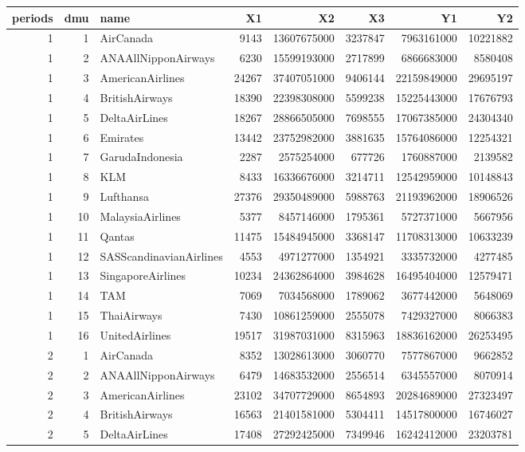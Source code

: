 \begin{tabular}{rrlrrrrr}
\toprule
periods & dmu & name & X1 & X2 & X3 & Y1 & Y2 \\
\midrule
1 & 1 & AirCanada & 9143 & 13607675000 & 3237847 & 7963161000 & 10221882 \\
1 & 2 & ANAAllNipponAirways & 6230 & 15599193000 & 2717899 & 6866683000 & 8580408 \\
1 & 3 & AmericanAirlines & 24267 & 37407051000 & 9406144 & 22159849000 & 29695197 \\
1 & 4 & BritishAirways & 18390 & 22398308000 & 5599238 & 15225443000 & 17676793 \\
1 & 5 & DeltaAirLines & 18267 & 28866505000 & 7698555 & 17067385000 & 24304340 \\
1 & 6 & Emirates & 13442 & 23752982000 & 3881635 & 15764086000 & 12254321 \\
1 & 7 & GarudaIndonesia & 2287 & 2575254000 & 677726 & 1760887000 & 2139582 \\
1 & 8 & KLM & 8433 & 16336676000 & 3214711 & 12542959000 & 10148843 \\
1 & 9 & Lufthansa & 27376 & 29350489000 & 5988763 & 21193962000 & 18906526 \\
1 & 10 & MalaysiaAirlines & 5377 & 8457146000 & 1795361 & 5727371000 & 5667956 \\
1 & 11 & Qantas & 11475 & 15484945000 & 3368147 & 11708313000 & 10633239 \\
1 & 12 & SASScandinavianAirlines & 4553 & 4971277000 & 1354921 & 3335732000 & 4277485 \\
1 & 13 & SingaporeAirlines & 10234 & 24362864000 & 3984628 & 16495404000 & 12579471 \\
1 & 14 & TAM & 7069 & 7034568000 & 1789062 & 3677442000 & 5648069 \\
1 & 15 & ThaiAirways & 7430 & 10861259000 & 2555078 & 7429327000 & 8066383 \\
1 & 16 & UnitedAirlines & 19517 & 31987031000 & 8315963 & 18836162000 & 26253495 \\
2 & 1 & AirCanada & 8352 & 13028613000 & 3060770 & 7577867000 & 9662852 \\
2 & 2 & ANAAllNipponAirways & 6479 & 14683532000 & 2556514 & 6345557000 & 8070914 \\
2 & 3 & AmericanAirlines & 23102 & 34707729000 & 8654893 & 20284689000 & 27323497 \\
2 & 4 & BritishAirways & 16563 & 21401581000 & 5304411 & 14517800000 & 16746027 \\
2 & 5 & DeltaAirLines & 17408 & 27292425000 & 7349946 & 16242412000 & 23203781 \\

\end{tabular}
